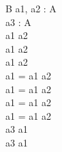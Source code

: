 \begin{zed}
	[A]
\end{zed}

\begin{schema}{B}
	a1, a2 : \power A \\
	a3 : A \\
\where
	a1 \subseteq a2 \\
	a1 \neq a2 \\
	a1 \subset a2 \\
	a1 = a1 \setminus a2 \\
	a1 = a1 \symdiff a2 \\
	a1 = a1 \cup a2 \\
	a1 = a1 \cap a2 \\
	a3 \in a1 \\
	a3 \notin a1 \\
\end{schema}